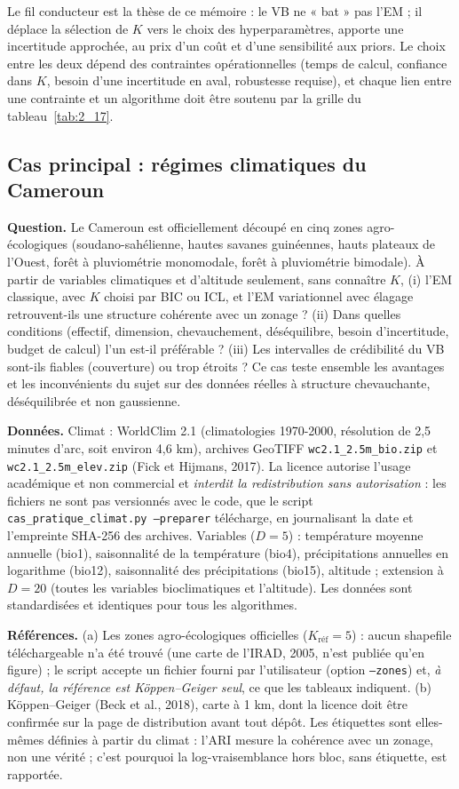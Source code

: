 Le fil conducteur est la thèse de ce mémoire : le VB ne « bat » pas l'EM ; il déplace la sélection de $K$ vers le choix des hyperparamètres, apporte une incertitude approchée, au prix d'un coût et d'une sensibilité aux priors. Le choix entre les deux dépend des contraintes opérationnelles (temps de calcul, confiance dans $K$, besoin d'une incertitude en aval, robustesse requise), et chaque lien entre une contrainte et un algorithme doit être soutenu par la grille du tableau~\ref{tab:2_17}.

\subsection{Cas principal : régimes climatiques du Cameroun}
\textbf{Question. }Le Cameroun est officiellement découpé en cinq zones agro-écologiques (soudano-sahélienne, hautes savanes guinéennes, hauts plateaux de l'Ouest, forêt à pluviométrie monomodale, forêt à pluviométrie bimodale). À partir de variables climatiques et d'altitude seulement, sans connaître $K$, (i) l'EM classique, avec $K$ choisi par BIC ou ICL, et l'EM variationnel avec élagage retrouvent-ils une structure cohérente avec un zonage ? (ii) Dans quelles conditions (effectif, dimension, chevauchement, déséquilibre, besoin d'incertitude, budget de calcul) l'un est-il préférable ? (iii) Les intervalles de crédibilité du VB sont-ils fiables (couverture) ou trop étroits ? Ce cas teste ensemble les avantages et les inconvénients du sujet sur des données réelles à structure chevauchante, déséquilibrée et non gaussienne.

\textbf{Données. }Climat : WorldClim 2.1 (climatologies 1970-2000, résolution de 2,5 minutes d'arc, soit environ 4,6 km), archives GeoTIFF \texttt{wc2.1\_2.5m\_bio.zip} et \texttt{wc2.1\_2.5m\_elev.zip} (Fick et Hijmans, 2017). La licence autorise l'usage académique et non commercial et \emph{interdit la redistribution sans autorisation} : les fichiers ne sont pas versionnés avec le code, que le script \texttt{cas\_pratique\_climat.py --preparer} télécharge, en journalisant la date et l'empreinte SHA-256 des archives. Variables ($D=5$) : température moyenne annuelle (bio1), saisonnalité de la température (bio4), précipitations annuelles en logarithme (bio12), saisonnalité des précipitations (bio15), altitude ; extension à $D=20$ (toutes les variables bioclimatiques et l'altitude). Les données sont standardisées et identiques pour tous les algorithmes.

\textbf{Références. }(a) Les zones agro-écologiques officielles ($K_{\text{réf}}=5$) : aucun shapefile téléchargeable n'a été trouvé (une carte de l'IRAD, 2005, n'est publiée qu'en figure) ; le script accepte un fichier fourni par l'utilisateur (option \texttt{--zones}) et, \emph{à défaut, la référence est Köppen--Geiger seul}, ce que les tableaux indiquent. (b) Köppen--Geiger (Beck et al., 2018), carte à 1 km, dont la licence doit être confirmée sur la page de distribution avant tout dépôt. Les étiquettes sont elles-mêmes définies à partir du climat : l'ARI mesure la cohérence avec un zonage, non une vérité ; c'est pourquoi la log-vraisemblance hors bloc, sans étiquette, est rapportée.

